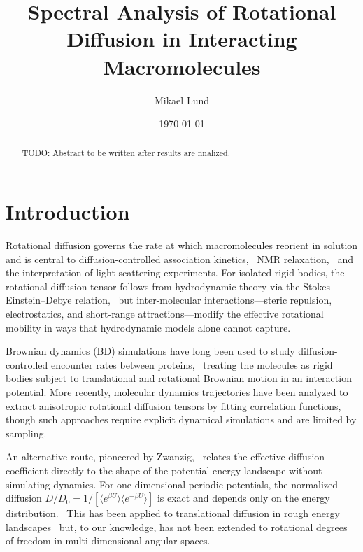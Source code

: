 \documentclass[aps,jcp,reprint,superscriptaddress]{revtex4-2}
\newcommand{\avg}[1]{\langle #1 \rangle}
\begin{document}
\title{Spectral Analysis of Rotational Diffusion in Interacting Macromolecules}

\author{Mikael Lund}

\date{\today}

\begin{abstract}
TODO: Abstract to be written after results are finalized.
\end{abstract}

\maketitle

\section{Introduction}
\label{sec:intro}

Rotational diffusion governs the rate at which macromolecules reorient in solution
and is central to diffusion-controlled association kinetics,~\cite{northrup1984}
NMR relaxation,~\cite{holtbrugge2025} and the interpretation of light scattering experiments.
For isolated rigid bodies, the rotational diffusion tensor follows from hydrodynamic
theory via the Stokes--Einstein--Debye relation,~\cite{debye1929}
but inter-molecular interactions---steric repulsion, electrostatics, and
short-range attractions---modify the effective rotational mobility in ways that
hydrodynamic models alone cannot capture.

Brownian dynamics (BD) simulations have long been used to study
diffusion-controlled encounter rates between proteins,~\cite{northrup1984}
treating the molecules as rigid bodies subject to translational and rotational
Brownian motion in an interaction potential.
More recently, molecular dynamics trajectories have been analyzed to extract
anisotropic rotational diffusion tensors by fitting correlation
functions,~\cite{holtbrugge2025} though such approaches require explicit
dynamical simulations and are limited by sampling.

An alternative route, pioneered by Zwanzig,~\cite{zwanzig1988} relates the
effective diffusion coefficient directly to the shape of the potential energy
landscape without simulating dynamics.
For one-dimensional periodic potentials, the normalized diffusion
$D/D_0 = 1/[\avg{e^{\beta U}} \avg{e^{-\beta U}}]$
is exact and depends only on the energy distribution.~\cite{banerjee2014}
This has been applied to translational diffusion in rough energy
landscapes~\cite{gustafsson2024} but, to our knowledge, has not been extended to
rotational degrees of freedom in multi-dimensional angular spaces.
\end{document}
